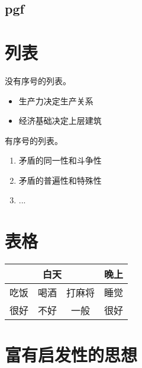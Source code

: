 \documentclass[openany,oneside]{book}
\theoremstyle{cthmstyle}
\theoremstyle{remark}
\begin{document}
\subsection{pgf}

\begin{center}
\end{center}

\newpage
\section{列表}

没有序号的列表。
\begin{itemize}
\item 生产力决定生产关系
\item 经济基础决定上层建筑
\end{itemize}

有序号的列表。
\begin{enumerate}
\item 矛盾的同一性和斗争性
\item 矛盾的普遍性和特殊性
\item ...
\end{enumerate}

\section{表格}

\begin{center}
        \begin{tabular}{|c|c|c|c|}
        \hline
        \multicolumn{3}{|c|}{白天} & 晚上 \\ \hline
        吃饭     & 喝酒     & 打麻将    & 睡觉 \\ \hline
        很好     & 不好     & 一般     & 很好 \\ \hline
        \end{tabular}
\end{center}

%
\clearpage
\section{富有启发性的思想}
\end{document}
